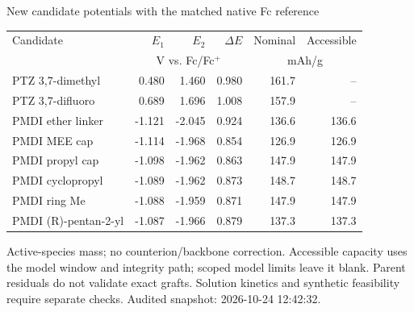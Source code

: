 \begin{frame}{New candidate potentials with the matched native Fc reference}
\scriptsize\renewcommand{\arraystretch}{1.25}\centering
\begin{tabular}{@{}p{4.7cm}rrrrr@{}}\toprule
Candidate & $E_1$ & $E_2$ & $\Delta E$ & Nominal & Accessible \\
& \multicolumn{3}{c}{V vs. Fc/Fc$^+$} & \multicolumn{2}{c}{mAh/g} \\ \midrule
PTZ 3,7-dimethyl & 0.480 & 1.460 & 0.980 & 161.7 & -- \\
PTZ 3,7-difluoro & 0.689 & 1.696 & 1.008 & 157.9 & -- \\
PMDI ether linker & -1.121 & -2.045 & 0.924 & 136.6 & 136.6 \\
PMDI MEE cap & -1.114 & -1.968 & 0.854 & 126.9 & 126.9 \\
PMDI propyl cap & -1.098 & -1.962 & 0.863 & 147.9 & 147.9 \\
PMDI cyclopropyl & -1.089 & -1.962 & 0.873 & 148.7 & 148.7 \\
PMDI ring Me & -1.088 & -1.959 & 0.871 & 147.9 & 147.9 \\
PMDI (R)-pentan-2-yl & -1.087 & -1.966 & 0.879 & 137.3 & 137.3 \\
\bottomrule\end{tabular}\par
\vspace{1ex}\raggedright
\footnotesize Active-species mass; no counterion/backbone correction. Accessible capacity uses the model window and integrity path; scoped model limits leave it blank.
\vspace{1ex}\scriptsize Parent residuals do not validate exact grafts. Solution kinetics and synthetic feasibility require separate checks.
\vfill\scriptsize Audited snapshot: 2026-10-24 12:42:32.
\end{frame}
